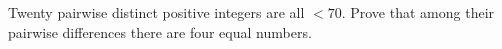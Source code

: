 Twenty pairwise distinct positive integers are all $< 70$. Prove that among their pairwise differences there are four equal numbers.
